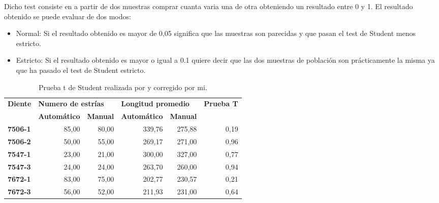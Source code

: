 Dicho test consiste en a partir de dos muestras comprar cuanta varia una de otra obteniendo un resultado entre 0 y 1. El resultado obtenido se puede evaluar de dos modos:
\begin{itemize}
\item Normal: Si el resultado obtenido es mayor de 0,05 significa que las muestras son parecidas y que pasan el test de Student menos estricto.
\item Estricto: Si el resultado obtenido es mayor o igual a 0.1 quiere decir que las dos muestras de población son prácticamente la misma ya que ha pasado el test de Student estricto.
\end{itemize} 

\begin{table}[]
\centering
\caption{Prueba t de Student realizada por \cite{Rebeca:garcia} y corregido por mi.}
\label{tab:estud}
\begin{tabular}{@{} lrrrrr @{}}
\toprule
\multirow{2}{*}{\textbf{Diente}} & \multicolumn{2}{l}{\textbf{Numero de estrías}} & \multicolumn{2}{l}{\textbf{Longitud promedio}} & \multirow{2}{*}{\textbf{Prueba T}} \\ \cline{2-5}
                                 & \textbf{Automático}      & \textbf{Manual}     & \textbf{Automático}      & \textbf{Manual}     &                                    \\ \midrule
\textbf{7506-1}                  & 85,00                    & 80,00               & 339,76                   & 275,88              & 0,19                               \\ \midrule
\textbf{7506-2}                  & 50,00                    & 55,00               & 269,17                   & 271,00              & 0,96                               \\ \midrule
\textbf{7547-1}                  & 23,00                    & 21,00               & 300,00                   & 327,00              & 0,77                               \\ \midrule
\textbf{7547-3}                  & 24,00                    & 24,00               & 263,70                   & 260,00              & 0,94                               \\ \midrule
\textbf{7672-1}                  & 83,00                    & 75,00               & 202,77                   & 230,57              & 0,21                               \\ \midrule
\textbf{7672-3}                  & 56,00                    & 52,00               & 211,93                   & 231,00              & 0,64                               \\ \midrule

\end{tabular}
\end{table}
